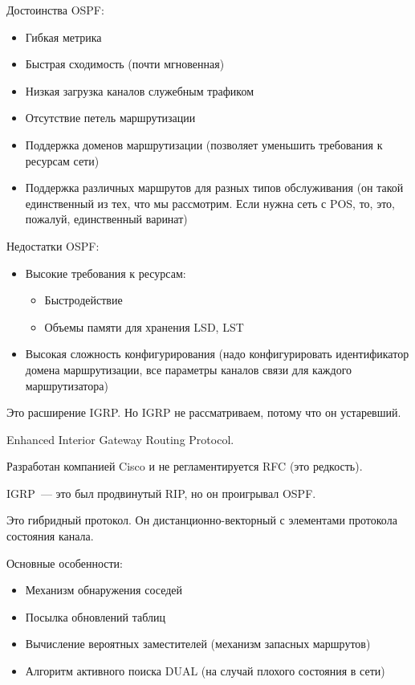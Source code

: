 Достоинства OSPF:
\begin{itemize}
    \item Гибкая метрика
    \item Быстрая сходимость (почти мгновенная)
    \item Низкая загрузка каналов служебным трафиком
    \item Отсутствие петель маршрутизации
    \item Поддержка доменов маршрутизации (позволяет уменьшить требования к ресурсам сети)
    \item Поддержка различных маршрутов для разных типов обслуживания (он такой единственный из тех, что мы рассмотрим. Если нужна сеть с POS, то, это, пожалуй, единственный варинат)
\end{itemize}
Недостатки OSPF:
\begin{itemize}
    \item Высокие требования к ресурсам:
    \begin{itemize}
        \item Быстродействие
        \item Объемы памяти для хранения LSD, LST
    \end{itemize}
    \item Высокая сложность конфигурирования (надо конфигурировать идентификатор домена маршрутизации, все параметры каналов связи для каждого маршрутизатора)
\end{itemize}


Это расширение IGRP. Но IGRP не рассматриваем, потому что он устаревший.

Enhanced Interior Gateway Routing Protocol.

Разработан компанией Cisco и не регламентируется RFC (это редкость).

IGRP~--- это был продвинутый RIP, но он проигрывал OSPF.

Это гибридный протокол. Он дистанционно-векторный с элементами протокола состояния канала.

Основные особенности:
\begin{itemize}
    \item Механизм обнаружения соседей
    \item Посылка обновлений таблиц
    \item Вычисление вероятных заместителей (механизм запасных маршрутов)
    \item Алгоритм активного поиска DUAL (на случай плохого состояния в сети)
\end{itemize}

